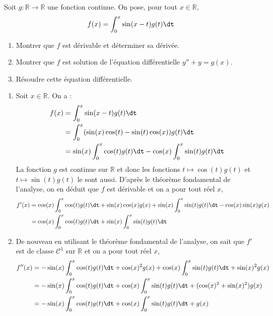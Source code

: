 \documentclass[a4paper,10pt]{report}
\begin{document}
\begin{Exercice}{} Soit $g : \mathbb{R} \rightarrow \mathbb{R}$ une fonction continue. On pose, pour tout $x \in \mathbb{R}$,
    \[
    f(x) = \int_0^x {\sin(x - t)g(t) \dt}
    \]
    \begin{enumerate}
      \item Montrer que $f$ est dérivable et déterminer sa dérivée.
      \item Montrer que $f$ est solution de l'équation différentielle $y'' + y = g(x)$.
      \item Résoudre cette équation différentielle.
    \end{enumerate}
\end{Exercice}

\begin{enumerate}
\item Soit $x \in \mathbb{R}$. On a :
\begin{align*}
f(x) &= \int_0^x \sin(x - t)g(t) \dt \\
& = \int_0^x (\sin(x)\cos(t)-\sin(t)\cos(x))g(t) \dt \\
& = \sin(x) \int_0^x \cos(t)g(t) \dt  -\cos(x) \int_0^x \sin(t)g(t) \dt \\
\end{align*}
La fonction $g$ est continue sur $\mathbb{R}$ et donc les fonctions $t \mapsto \cos(t)g(t)$ et $t \mapsto \sin(t)g(t)$ le sont aussi. D'après le théorème fondamental de l'analyse, on en déduit que $f$ est dérivable et on a pour tout réel $x$,
\begin{align*}
f'(x) & = \cos(x) \int_0^x \cos(t)g(t) \dt + \sin(x)\cos(x) g(x) + \sin(x) \int_0^x \sin(t)g(t) \dt - \cos(x) \sin(x)g(x) \\
& = \cos(x) \int_0^x \cos(t)g(t) \dt  + \sin(x) \int_0^x \sin(t)g(t) \dt 
\end{align*}
\item De nouveau en utilisant le théorème fondamental de l'analyse, on sait que $f'$ est de classe $\mathcal{C}^1$ sur $\mathbb{R}$ et on a pour tout réel $x$,
\begin{align*}
f''(x) & = - \sin(x)\int_0^x \cos(t)g(t) \dt + \cos(x)^2 g(x) + \cos(x)  \int_0^x \sin(t)g(t) \dt  + \sin(x)^2 g(x) \\
& =  - \sin(x)\int_0^x \cos(t)g(t) \dt  + \cos(x)  \int_0^x \sin(t)g(t) \dt  + (\cos(x)^2+\sin(x)^2) g(x) \\
& =  - \sin(x)\int_0^x \cos(t)g(t) \dt  + \cos(x)  \int_0^x \sin(t)g(t) \dt + g(x) \\
\end{align*}

\end{enumerate}
\end{document}
